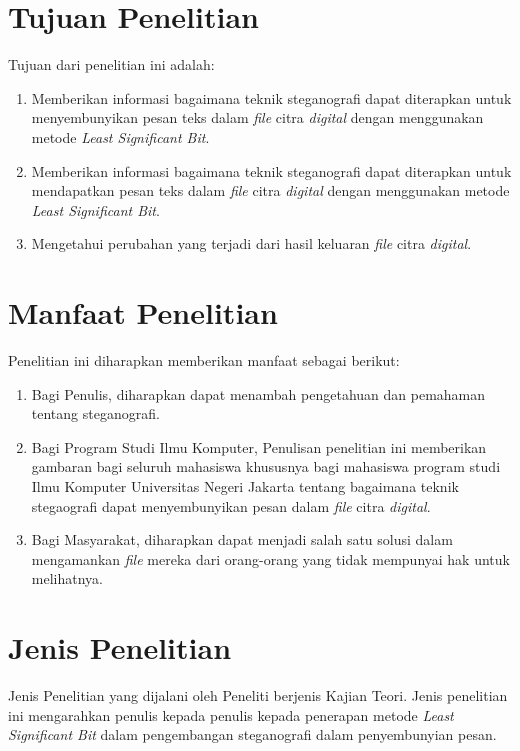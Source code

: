 \section{Tujuan Penelitian}
Tujuan dari penelitian ini adalah: 
\begin{enumerate}
	\item Memberikan informasi bagaimana teknik steganografi dapat diterapkan untuk menyembunyikan pesan teks dalam \emph{file} citra \emph{digital} dengan menggunakan metode \emph{Least Significant Bit}. 
	\item Memberikan informasi bagaimana teknik steganografi dapat diterapkan untuk mendapatkan pesan teks dalam \emph{file} citra \emph{digital} dengan menggunakan metode \emph{Least Significant Bit}. 
	\item Mengetahui perubahan yang terjadi dari hasil keluaran \emph{file} citra \emph{digital}.
\end{enumerate}

\section{Manfaat Penelitian}
Penelitian ini diharapkan memberikan manfaat sebagai berikut:
	\begin{enumerate}
		\item Bagi Penulis, diharapkan dapat menambah pengetahuan dan pemahaman tentang steganografi.
		\item Bagi Program Studi Ilmu Komputer, Penulisan penelitian ini memberikan gambaran bagi seluruh mahasiswa khususnya bagi mahasiswa program studi Ilmu Komputer Universitas Negeri Jakarta tentang bagaimana teknik stegaografi dapat menyembunyikan pesan dalam \emph{file} citra \emph{digital}.
		\item Bagi Masyarakat, diharapkan dapat menjadi salah satu solusi dalam mengamankan \emph{file} mereka dari orang-orang yang tidak mempunyai hak untuk melihatnya.   	
	\end{enumerate}

\section{Jenis Penelitian}
Jenis Penelitian yang dijalani oleh Peneliti berjenis Kajian Teori. Jenis penelitian ini mengarahkan penulis kepada penulis kepada penerapan metode \emph{Least Significant Bit} dalam pengembangan steganografi dalam penyembunyian pesan.		
\begin{comment}

\end{comment}
